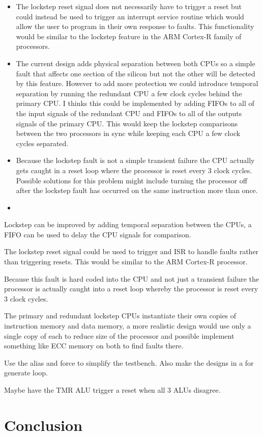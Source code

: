 \documentclass[12pt]{article}
\begin{document}
\begin{itemize}
    \item The lockstep reset signal does not necessarily have to trigger a reset but could instead be used to trigger an interrupt service routine which would allow the user to program in their own response to faults. This functionality would be similar to the lockstep feature in the ARM Cortex-R family of processors.
    
    \item The current design adds physical separation between both CPUs so a simple fault that affects one section of the silicon but not the other will be detected by this feature. However to add more protection we could introduce temporal separation by running the redundant CPU a few clock cycles behind the primary CPU. I thinks this could be implemented by adding FIFOs to all of the input signals of the redundant CPU and FIFOs to all of the outputs signals of the primary CPU. This would keep the lockstep comparisons between the two processors in sync while keeping each CPU a few clock cycles separated.
    
    \item Because the lockstep fault is not a simple transient failure the CPU actually gets caught in a reset loop where the processor is reset every 3 clock cycles. Possible solutions for this problem might include turning the processor off after the lockstep fault has occurred on the same instruction more than once.
    
    \item 
\end{itemize}
Lockstep can be improved by adding temporal separation between the CPUs, a FIFO can be used to delay the CPU signals for comparison.

The lockstep reset signal could be used to trigger and ISR to handle faults rather than triggering resets. This would be similar to the ARM Cortex-R processor.

Because this fault is hard coded into the CPU and not just a transient failure the processor is actually caught into a reset loop whereby the processor is reset every 3 clock cycles.

The primary and redundant lockstep CPUs instantiate their own copies of instruction memory and data memory, a more realistic design would use only a single copy of each to reduce size of the processor and possible implement something like ECC memory on both to find faults there.

Use the alias and force to simplify the testbench. Also make the designs in a for generate loop.

Maybe have the TMR ALU trigger a reset when all 3 ALUs disagree.

\section{Conclusion}
\end{document}
